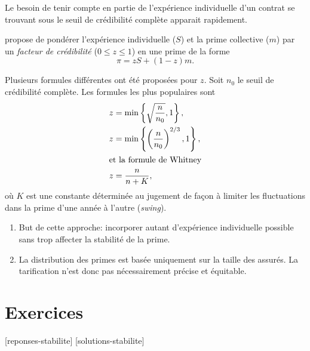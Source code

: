 Le besoin de tenir compte en partie de l'expérience individuelle d'un
contrat se trouvant sous le seuil de crédibilité complète apparait
rapidement.

\cite{Whitney:1918} propose de pondérer l'expérience individuelle
($S$) et la prime collective ($m$) par un \emph{facteur de
  crédibilité} ($0 \leq z \leq 1$) en une prime de la forme
\begin{displaymath}
  \pi = z S + (1 - z) m.
\end{displaymath}

Plusieurs formules différentes ont été proposées pour $z$. Soit $n_0$
le seuil de crédibilité complète. Les formules les plus populaires
sont
\begin{align*}
  z &= \min \left\{ \sqrt{\frac{n}{n_0}}, 1 \right\}, \\
  z &= \min \left\{ \left( \frac{n}{n_0} \right)^{2/3}, 1 \right\}, \\
  \intertext{et la formule de Whitney}
  z &= \frac{n}{n + K},
\end{align*}
où $K$ est une constante déterminée au jugement de façon à limiter les
fluctuations dans la prime d'une année à l'autre (\emph{swing}).

\begin{rems}
  \begin{enumerate}
  \item But de cette approche: incorporer autant d'expérience
    individuelle possible sans trop affecter la stabilité de la prime.
  \item La distribution des primes est basée uniquement sur la taille
    des assurés. La tarification n'est donc pas nécessairement précise
    et équitable.
  \end{enumerate}
\end{rems}


\section{Exercices}
\label{sec:stabilite:exercices}

[reponses-stabilite]
[solutions-stabilite]

